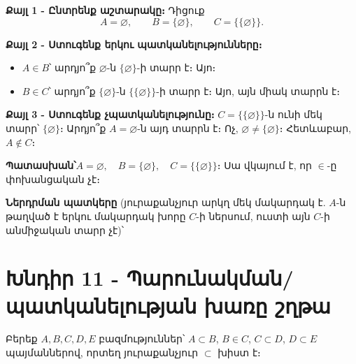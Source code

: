 \documentclass[11pt,a4paper]{article}
\newcommand{\answer}[1]{\begin{answerbox}\centering\textbf{Պատասխան՝}\quad #1\end{answerbox}}
\begin{document}
\textbf{Քայլ 1 - Ընտրենք աշտարակը։}
Դիցուք
$$A=\varnothing,\qquad B=\{\varnothing\},\qquad C=\{\{\varnothing\}\}.$$

\textbf{Քայլ 2 - Ստուգենք երկու պատկանելությունները։}
\begin{itemize}[leftmargin=1.4cm]
\item $A\in B$՝ արդյո՞ք $\varnothing$-ն $\{\varnothing\}$-ի տարր է։ Այո։ \checkmark
\item $B\in C$՝ արդյո՞ք $\{\varnothing\}$-ն $\{\{\varnothing\}\}$-ի տարր է։ Այո, այն միակ տարրն է։ \checkmark
\end{itemize}

\textbf{Քայլ 3 - Ստուգենք չպատկանելությունը։}
$C=\{\{\varnothing\}\}$-ն ունի մեկ տարր՝ $\{\varnothing\}$։ Արդյո՞ք $A=\varnothing$-ն այդ տարրն է։
Ոչ, $\varnothing\neq\{\varnothing\}$։ Հետևաբար, $A\notin C$։ \checkmark

\answer{$A=\varnothing,\quad B=\{\varnothing\},\quad C=\{\{\varnothing\}\}$։ \quad Սա վկայում է, որ $\in$-ը փոխանցական չէ։}

\medskip
\textbf{Ներդրման պատկերը} (յուրաքանչյուր արկղ մեկ մակարդակ է. $A$-ն թաղված է երկու մակարդակ խորը $C$-ի
ներսում, ուստի այն $C$-ի անմիջական տարր չէ)՝

\begin{center}
\end{center}

\section*{Խնդիր 11 - Պարունակման/պատկանելության խառը շղթա}

\begin{problembox}[11]
Բերեք $A,B,C,D,E$ բազմություններ՝ $A\subset B$, $B\in C$, $C\subset D$, $D\subset E$ պայմաններով, որտեղ
յուրաքանչյուր $\subset$ խիստ է։
\end{problembox}
\end{document}
